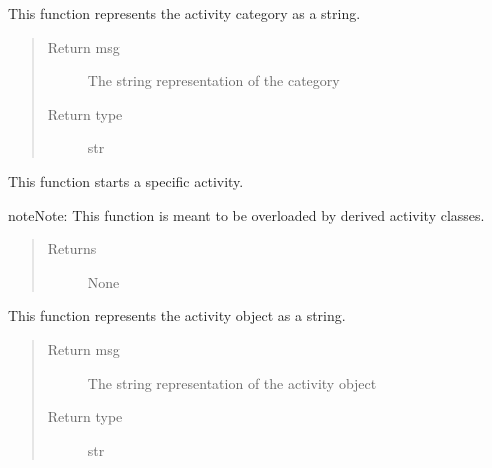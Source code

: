 \documentclass[letterpaper,10pt,english]{sphinxmanual}
\begin{document}
\begin{fulllineitems}

\begin{fulllineitems}
\label{activity:activity.Activity.print_id}
This function represents the activity category as a string.
\begin{quote}\begin{description}
\item[{Return msg}] \leavevmode
The string representation of the category

\item[{Return type}] \leavevmode
str

\end{description}\end{quote}

\end{fulllineitems}


\begin{fulllineitems}
\label{activity:activity.Activity.start}
This function starts a specific activity.

\begin{notice}{note}{Note:}
This function is meant to be overloaded by derived activity classes.
\end{notice}
\begin{quote}\begin{description}
\item[{Returns}] \leavevmode
None

\end{description}\end{quote}

\end{fulllineitems}


\begin{fulllineitems}
\label{activity:activity.Activity.toString}
This function represents the activity object as a string.
\begin{quote}\begin{description}
\item[{Return msg}] \leavevmode
The string representation of the activity object

\item[{Return type}] \leavevmode
str

\end{description}\end{quote}

\end{fulllineitems}


\end{fulllineitems}
\end{document}
